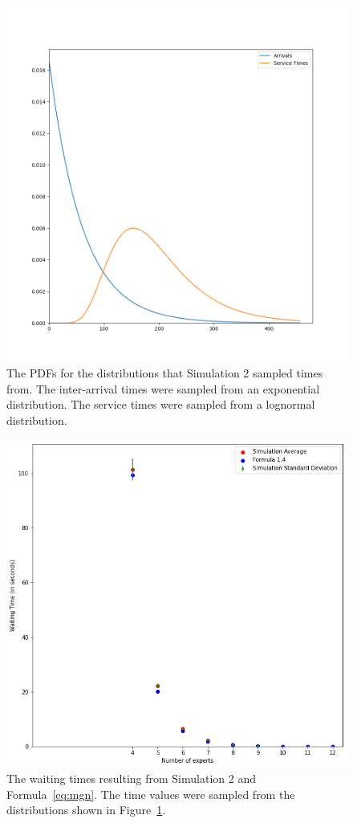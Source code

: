 \begin{figure}[H]
  \includegraphics[width=\textwidth]{figures/montecarlo/expon_lognorm.png}
  \caption{
    The PDFs for the distributions that Simulation 2
    sampled times from.
    The inter-arrival times were sampled from an exponential distribution.
    The service times were sampled from a lognormal distribution.
  }\label{fig:simple_sim2_dists}
\end{figure}

\begin{figure}[H]
  \includegraphics[width=\textwidth]{figures/montecarlo/independent_calls_lognorm.png}
  \caption{
    The waiting times resulting from Simulation 2 and Formula~\ref{eq:mgn}.
    The time values were sampled from the distributions shown in
    Figure~\ref{fig:simple_sim2_dists}.
  }\label{fig:simple_sim2_results}
\end{figure}

